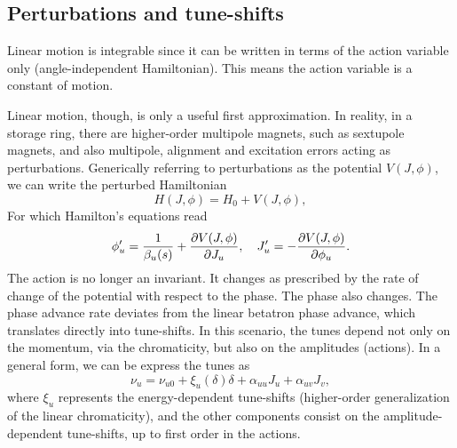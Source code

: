\subsection{Perturbations and tune-shifts}
Linear motion is integrable since it can be written in terms of the action variable only (angle-independent Hamiltonian). This means the action variable is a constant of motion.

Linear motion, though, is only a useful first approximation. In reality, in a storage ring, there are higher-order multipole magnets, such as sextupole magnets, and also multipole, alignment and excitation errors acting as perturbations. Generically referring to perturbations as the potential $V(J, \phi)$, we can write the perturbed Hamiltonian
\begin{equation}
    H(J,\phi) =H_0 + V(J,\phi),
\end{equation}
For which Hamilton's equations read
\begin{equation}
\phi_u^\prime = \frac{1}{\beta_u(s)}+\pdv{V(J,\phi)}{J_u}, \quad J_u^\prime = -\pdv{V(J,\phi)}{\phi_u}.
\end{equation}
The action is no longer an invariant. It changes as prescribed by the rate of change of the potential with respect to the phase. The phase also changes. The phase advance rate deviates from the linear betatron phase advance, which translates directly into tune-shifts. In this scenario, the tunes depend not only on the momentum, via the chromaticity, but also on the amplitudes (actions). In a general form, we can be express the tunes as
\begin{equation}
    \nu_u = \nu_{u0} + \xi_u(\delta) \delta + \alpha_{uu} J_u + \alpha_{uv} J_v,
\end{equation}
where $\xi_u$ represents the energy-dependent tune-shifts (higher-order generalization of the linear chromaticity), and the other components consist on the amplitude-dependent tune-shifts, up to first order in the actions.
